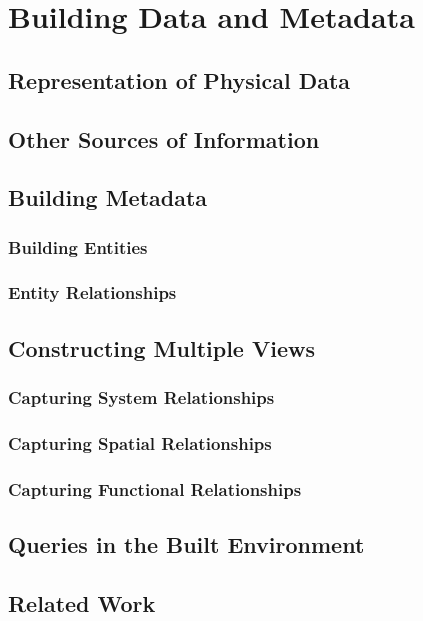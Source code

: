 \chapter{Building Data and Metadata}

\section{Representation of Physical Data}

\section{Other Sources of Information}


\section{Building Metadata}
\subsection{Building Entities}
\subsection{Entity Relationships}

\section{Constructing Multiple Views}
\subsection{Capturing System Relationships}
\subsection{Capturing Spatial Relationships}
\subsection{Capturing Functional Relationships}

\section{Queries in the Built Environment}

\section{Related Work}

